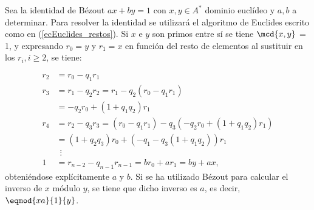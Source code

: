 \begin{dem}{\cite[p.~53]{GamboaAnillos}}
    Sea la identidad de Bézout $ax + by = 1$ con $x,y\in A^*$ dominio euclídeo y $a,b$ a determinar. Para resolver la identidad se utilizará el algoritmo de Euclides escrito como en (\ref{ecEuclides_restos}). Si $x$ e $y$ son primos entre sí se tiene $\mcd{x,y}$ = 1, y expresando $r_0 = y$ y $r_1 = x$ en función del resto de elementos al sustituir en los $r_i, i\geq2$, se tiene:
    
        \begin{equation}
            \begin{aligned}
                r_2 &= r_0 - q_1r_1 \\
                r_3 &= r_1 - q_2r_2 = r_1 -q_2(r_0 - q_1r_1) \\
                &=-q_2r_0 + (1+q_1q_2)r_1\\
                r_4 &= r_2 - q_3r_3 = (r_0 - q_1r_1) - q_3(-q_2r_0 + (1+q_1q_2)r_1) \\
                &=(1+q_2q_3)r_0 +(-q_1-q_3(1+q_1q_2))r_1 \\
                &\ \ \vdots \\
                1 &= r_{n-2}- q_{n-1}r_{n-1} = b r_0 + a r_1 = by + ax,
            \end{aligned}
            \tag{**}
            \label{ec:EuclidesExtendidoBezout}
        \end{equation} 
        obteniéndose explícitamente $a$ y $b$. Si se ha utilizado Bézout para calcular el inverso de $x$ módulo $y$, se tiene que dicho inverso es $a$, es decir, $\eqmod{xa}{1}{y}$.
\end{dem}

